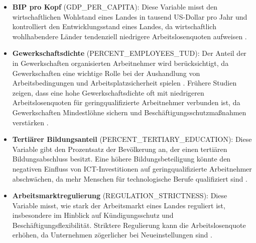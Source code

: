 \begin{itemize}
    \item \textbf{\ac{BIP} pro Kopf} (GDP\_PER\_CAPITA): Diese Variable misst den 
    wirtschaftlichen Wohlstand eines Landes in tausend US-Dollar pro Jahr und kontrolliert 
    den Entwicklungsstand eines Landes, da wirtschaftlich wohlhabendere Länder tendenziell 
    niedrigere Arbeitslosenquoten aufweisen \parencite{oecd2022gdp}.

    \item \textbf{Gewerkschaftsdichte} (PERCENT\_EMPLOYEES\_TUD): Der Anteil der in 
    Gewerkschaften organisierten Arbeitnehmer wird berücksichtigt, da Gewerkschaften eine 
    wichtige Rolle bei der Aushandlung von Arbeitsbedingungen und Arbeitsplatzsicherheit 
    spielen \parencite{oecd2022tud}. Frühere Studien zeigen, dass eine hohe Gewerkschaftsdichte 
    oft mit niedrigeren Arbeitslosenquoten für geringqualifizierte Arbeitnehmer verbunden ist, da 
    Gewerkschaften Mindestlöhne sichern und Beschäftigungsschutzmaßnahmen verstärken 
    \parencite[S. 60-61]{nickell1997unemployment}.

    \item \textbf{Tertiärer Bildungsanteil} (PERCENT\_TERTIARY\_EDUCATION): Diese Variable gibt 
    den Prozentsatz der Bevölkerung an, der einen tertiären Bildungsabschluss besitzt. Eine 
    höhere Bildungsbeteiligung könnte den negativen Einfluss von \ac{ICT}-Investitionen auf 
    geringqualifizierte Arbeitnehmer abschwächen, da mehr Menschen für technologische Berufe 
    qualifiziert sind \parencite{oecd2022education}.

    \item \textbf{Arbeitsmarktregulierung} (REGULATION\_STRICTNESS): Diese Variable misst, wie 
    stark der Arbeitsmarkt eines Landes reguliert ist, insbesondere im Hinblick auf 
    Kündigungsschutz und Beschäftigungsflexibilität. Striktere Regulierung kann die 
    Arbeitslosenquote erhöhen, da Unternehmen zögerlicher bei Neueinstellungen sind 
    \parencite{oecd2022regulation}.


\end{itemize}
